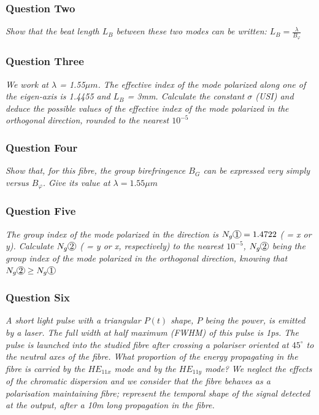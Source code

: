 \documentclass[colorlinks,11pt,a4paper,normalphoto,withhyper,ragged2e]{altareport}
\newcommand*\circled[1]{\tikz[baseline=(char.base)]{
            \node[shape=circle,draw,inner sep=0.5pt] (char) {#1};}}
\begin{document}
\subsubsection{Question Two}
\textit{Show that the beat length $L_B$ between these two modes can be written: $L_B = \frac{\lambda}{B_{\varphi}}$} \linebreak




\subsubsection{Question Three}
\textit{We work at $\lambda$ = 1.55$\mu m$. The effective index of the mode polarized along one of the eigen-axis is 1.4455 and $L_B$ = 3mm. Calculate the constant $\sigma$ (USI) and deduce the possible values of the effective index of the mode polarized in the orthogonal direction, rounded to the nearest $10^{-5}$} \linebreak




\subsubsection{Question Four}
\textit{Show that, for this fibre, the group birefringence $B_G$ can be expressed very simply versus $B_{\varphi}$. Give its value at $\lambda = 1.55 \mu m$} \linebreak




\subsubsection{Question Five}
\textit{The group index of the mode polarized in the direction \circled{1} is $N_{g}\circled{1} = 1.4722$ ( \circled{1} = x or y). Calculate $N_{g}\circled{2}$ ( \circled{2} = y or x, respectively) to the nearest $10^{-5}$, $N_{g}\circled{2}$ being the group index of the mode polarized in the orthogonal direction, knowing that $N_{g}\circled{2} \geq N_{g}\circled{1}$} \linebreak




\subsubsection{Question Six}
\textit{A short light pulse with a triangular $P(t)$ shape, $P$ being the power, is emitted by a laser. The full width at half maximum (FWHM) of this pulse is 1ps. The pulse is launched into the studied fibre after crossing a polariser oriented at $45^{\circ}$ to the neutral axes of the fibre. What proportion of the energy propagating in the fibre is carried by the $HE_{11x}$ mode and by the $HE_{11y}$ mode? We neglect the effects of the chromatic dispersion and we consider that the fibre behaves as a polarisation maintaining fibre; represent the temporal shape of the signal detected at the output, after a 10m long propagation in the fibre.} \linebreak
\end{document}
